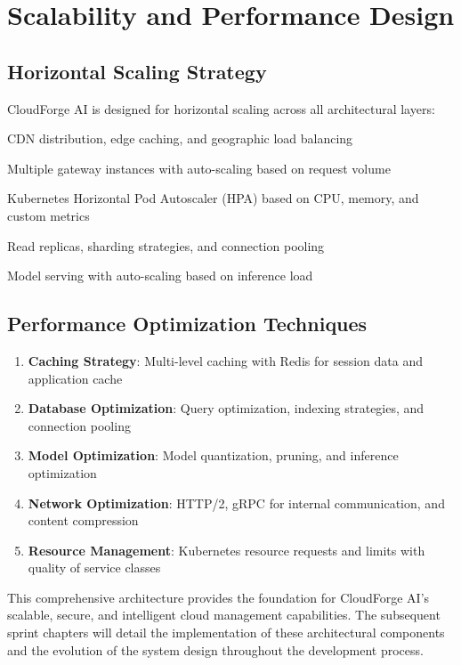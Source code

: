 \section{Scalability and Performance Design}

\subsection{Horizontal Scaling Strategy}

CloudForge AI is designed for horizontal scaling across all architectural layers:

\begin{description}[leftmargin=*]
    \item[Frontend Scaling] CDN distribution, edge caching, and geographic load balancing
    \item[API Gateway Scaling] Multiple gateway instances with auto-scaling based on request volume
    \item[Service Scaling] Kubernetes Horizontal Pod Autoscaler (HPA) based on CPU, memory, and custom metrics
    \item[Database Scaling] Read replicas, sharding strategies, and connection pooling
    \item[AI Model Scaling] Model serving with auto-scaling based on inference load
\end{description}

\subsection{Performance Optimization Techniques}

\begin{enumerate}[leftmargin=*]
    \item \textbf{Caching Strategy}: Multi-level caching with Redis for session data and application cache
    \item \textbf{Database Optimization}: Query optimization, indexing strategies, and connection pooling
    \item \textbf{Model Optimization}: Model quantization, pruning, and inference optimization
    \item \textbf{Network Optimization}: HTTP/2, gRPC for internal communication, and content compression
    \item \textbf{Resource Management}: Kubernetes resource requests and limits with quality of service classes
\end{enumerate}

This comprehensive architecture provides the foundation for CloudForge AI's scalable, secure, and intelligent cloud management capabilities. The subsequent sprint chapters will detail the implementation of these architectural components and the evolution of the system design throughout the development process.